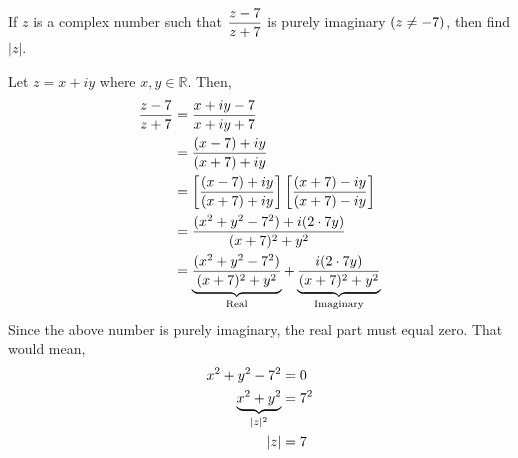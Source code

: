 

\question[4] If $z$ is a complex number such that $\dfrac{z-7}{z+7}$ 
is purely imaginary $(z\neq - 7)$, then find $|z|$.

\watchout

\begin{solution}[\fullpage]
  Let $z=x+iy$ where $x,y\in \mathbb{R}$. Then,
  \begin{align}
    \dfrac{z-7}{z+7} &= \dfrac{x+iy-7}{x+iy+7}\\
                         &= \dfrac{(x-7)+iy}{(x+7)+iy}\\
                         &= \left[\dfrac{(x-7)+iy}{(x+7)+iy}\right]
                            \left[\dfrac{(x+7)-iy}{(x+7)-iy}\right]\\
                         &= \dfrac{(x^2+y^2-7^2)+i(2\cdot7 y)}{(x+7)^2+y^2}\\
                         &= \underbrace{\dfrac{(x^2+y^2-7^2)}{(x+7)^2+y^2}}_{\text{Real}} +
                            \underbrace{\dfrac{i(2\cdot7 y)}{(x+7)^2+y^2}}_{\text{Imaginary}}
  \end{align}
  Since the above number is purely imaginary, the real part must 
  equal zero. That would mean,
  \begin{align}
    x^2+y^2-7^2 &= 0\\
    \underbrace{x^2+y^2}_{|z|^2}&= 7^2\\
    |z| &= 7
  \end{align}

\end{solution}

